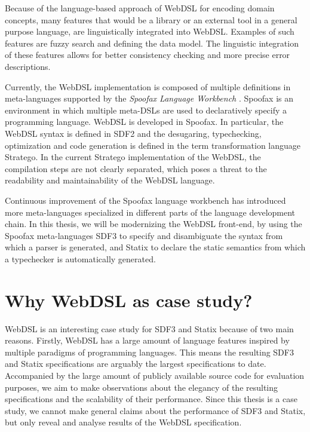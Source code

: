   Because of the language-based approach of WebDSL for encoding domain concepts, many features that would be a library or an external tool in a general purpose language, are linguistically integrated into WebDSL. Examples of such features are fuzzy search and defining the data model. The linguistic integration of these features allows for better consistency checking and more precise error descriptions.
  
  Currently, the WebDSL implementation is composed of multiple definitions in meta-languages supported by the \textit{Spoofax Language Workbench} \autocite{KatsV10}. Spoofax is an environment in which multiple meta-DSLs are used to declaratively specify a programming language. WebDSL is developed in Spoofax. In particular, the WebDSL syntax is defined in SDF2 and the desugaring, typechecking, optimization and code generation is defined in the term transformation language Stratego. In the current Stratego implementation of the WebDSL, the compilation steps are not clearly separated, which poses a threat to the readability and maintainability of the WebDSL language.

  Continuous improvement of the Spoofax language workbench has introduced more meta-languages specialized in different parts of the language development chain. In this thesis, we will be modernizing the WebDSL front-end, by using the Spoofax meta-languages SDF3 to specify and disambiguate the syntax from which a parser is generated, and Statix to declare the static semantics from which a typechecker is automatically generated.

  \section{\label{sec:why-webdsl}Why WebDSL as case study?}

    WebDSL is an interesting case study for SDF3 and Statix because of two main reasons. Firstly, WebDSL has a large amount of language features inspired by multiple paradigms of programming languages. This means the resulting SDF3 and Statix specifications are arguably the largest specifications to date. Accompanied by the large amount of publicly available source code for evaluation purposes, we aim to make observations about the elegancy of the resulting specifications and the scalability of their performance. Since this thesis is a case study, we cannot make general claims about the performance of SDF3 and Statix, but only reveal and analyse results of the WebDSL specification.

